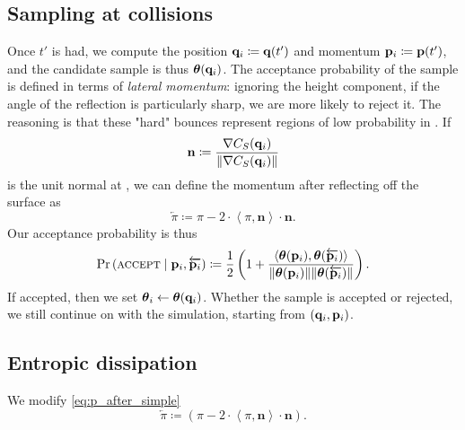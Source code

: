 \subsection{Sampling at collisions} \label{ss:sampling}

Once $t'$ is had, we compute the position $\mathbf{q}_i{} \coloneqq \mathbf{q}(t')$ and
momentum $\mathbf{p}_i{} \coloneqq \mathbf{p}(t')$, and the candidate sample is thus
$\boldsymbol{\theta}(\mathbf{q}_i{})$. The acceptance probability of the sample is defined in terms
of \emph{lateral momentum}: ignoring the height component, if the angle of the
reflection is particularly sharp, we are more likely to reject it. The reasoning
is that these "hard" bounces represent regions of low probability in \target{}.
If
\begin{equation*}
    \mathbf{n} \coloneqq \frac{\nabla C_{S}({\mathbf{q}_i{}})}{\lVert \nabla C_{S}({\mathbf{q}_i{}}) \rVert}
\end{equation*}
is the unit normal at \qi{}, we can define the momentum after reflecting off the
surface as
\begin{equation}
    \overleftarrow{\pi{}} \coloneqq \pi{} - 2 \cdot \left<\pi{}, \mathbf{n}\right> \cdot \mathbf{n}. \label{eq:p_after_simple}
\end{equation}
Our acceptance probability is thus
\begin{equation}
    \Pr\left(\textsc{accept} \mid \mathbf{p}_i{}, \overleftarrow{\mathbf{p}_i{}} \right) 
    \coloneqq \frac{1}{2}
    \left(1 + \frac{
        \left<\boldsymbol{\theta}(\mathbf{p}_i{}),\boldsymbol{\theta}(\overleftarrow{\mathbf{p}_i{}})\right>
    }{
        \lVert \boldsymbol{\theta}(\mathbf{p}_i{}) \rVert \lVert \boldsymbol{\theta}(\overleftarrow{\mathbf{p}_i{}}) \rVert
    }\right).
\end{equation}
If accepted, then we set $\boldsymbol{\theta}_i \leftarrow \boldsymbol{\theta}(\mathbf{q}_i{})$. Whether the
sample is accepted or rejected, we still continue on with the simulation,
starting from $(\mathbf{q}_i{}, \mathbf{p}_i{})$.

\subsection{Entropic dissipation} \label{ss:entropy}

We modify \cref{eq:p_after_simple}
\begin{equation}
    \overleftarrow{\pi{}} \coloneqq \left(\pi{} - 2 \cdot \left<\pi{}, \mathbf{n}\right> \cdot \mathbf{n}\right). \label{eq:p_after}
\end{equation}


